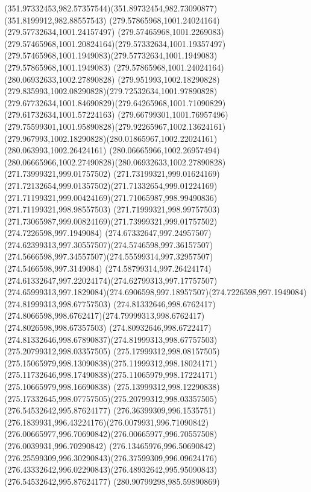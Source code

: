 {{		\curveto(351.97332453,982.57357544)(351.89732454,982.73090877)(351.8199912,982.88557543)
		\moveto(279.57865968,1001.24024164)
		\lineto(279.57732634,1001.24157497)
		\curveto(279.57465968,1001.2269083)(279.57465968,1001.20824164)(279.57332634,1001.19357497)
		\curveto(279.57465968,1001.1949083)(279.57732634,1001.1949083)(279.57865968,1001.1949083)
		\lineto(279.57865968,1001.24024164)
		\moveto(280.06932633,1002.27890828)
		\curveto(279.951993,1002.18290828)(279.835993,1002.08290828)(279.72532634,1001.97890828)
		\curveto(279.67732634,1001.84690829)(279.64265968,1001.71090829)(279.61732634,1001.57224163)
		\curveto(279.66799301,1001.76957496)(279.75599301,1001.95890828)(279.92265967,1002.13624161)
		\curveto(279.967993,1002.18290828)(280.01865967,1002.22024161)(280.063993,1002.26424161)
		\curveto(280.06665966,1002.26957494)(280.06665966,1002.27490828)(280.06932633,1002.27890828)
		\moveto(271.73999321,999.01757502)
		\curveto(271.73199321,999.01624169)(271.72132654,999.01357502)(271.71332654,999.01224169)
		\curveto(271.71199321,999.00424169)(271.71065987,998.99490836)(271.71199321,998.98557503)
		\curveto(271.71999321,998.99757503)(271.73065987,999.00824169)(271.73999321,999.01757502)
		\moveto(274.7226598,997.1949084)
		\curveto(274.67332647,997.24957507)(274.62399313,997.30557507)(274.5746598,997.36157507)
		\curveto(274.5666598,997.34557507)(274.55599314,997.32957507)(274.5466598,997.3149084)
		\curveto(274.58799314,997.26424174)(274.61332647,997.22024174)(274.62799313,997.17757507)
		\curveto(274.65999313,997.1829084)(274.6906598,997.18957507)(274.7226598,997.1949084)
		\moveto(274.81999313,998.67757503)
		\curveto(274.81332646,998.6762417)(274.8066598,998.6762417)(274.79999313,998.6762417)
		\lineto(274.8026598,998.67357503)
		\curveto(274.80932646,998.6722417)(274.81332646,998.67890837)(274.81999313,998.67757503)
		\moveto(275.20799312,998.03357505)
		\curveto(275.17999312,998.08157505)(275.15065979,998.13090838)(275.11999312,998.18024171)
		\curveto(275.11732646,998.17490838)(275.11065979,998.17224171)(275.10665979,998.16690838)
		\curveto(275.13999312,998.12290838)(275.17332645,998.07757505)(275.20799312,998.03357505)
		\moveto(276.54532642,995.87624177)
		\curveto(276.36399309,996.1535751)(276.1839931,996.43224176)(276.0079931,996.71090842)
		\curveto(276.00665977,996.70690842)(276.00665977,996.70557508)(276.0039931,996.70290842)
		\curveto(276.13465976,996.50690842)(276.25599309,996.30290843)(276.37599309,996.09624176)
		\curveto(276.43332642,996.02290843)(276.48932642,995.95090843)(276.54532642,995.87624177)
		\moveto(280.90799298,985.59890869)
}}
